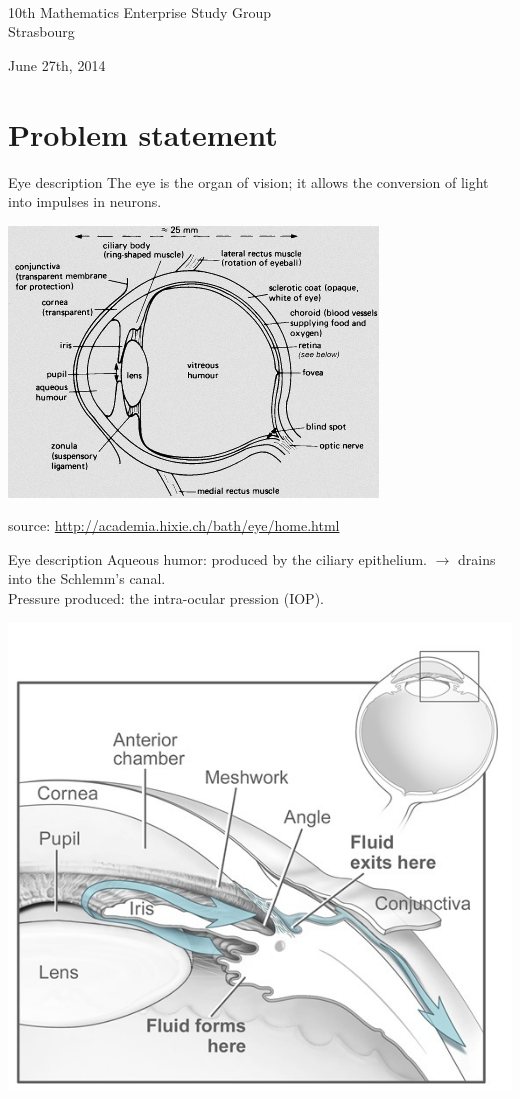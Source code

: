 \begin{frame}[c]


\begin{center}

\Large{}\\

\begin{center}
10th Mathematics Enterprise Study Group\\
Strasbourg
\end{center}

\bigskip
	\footnotesize\textcolor{brunfonce}{June 27th, 2014}
\end{center}

\end{frame}


\section{Problem statement}
\frame{\sectionpage}
\begin{frame}{Eye description}
The eye is the organ of vision; it allows the conversion of light into impulses in neurons.
\begin{center}
\includegraphics[width=.7\linewidth]{Eye.jpg}
\end{center}
\tiny{source: \url{http://academia.hixie.ch/bath/eye/home.html}}
\end{frame}

\begin{frame}{Eye description}
Aqueous humor: produced by the ciliary epithelium.
$\rightarrow$ drains into the Schlemm's canal.\\
Pressure produced: the intra-ocular pression (IOP).
\begin{center}
\includegraphics[width=.5\linewidth]{Humor.jpg}
\end{center}


\end{frame}

